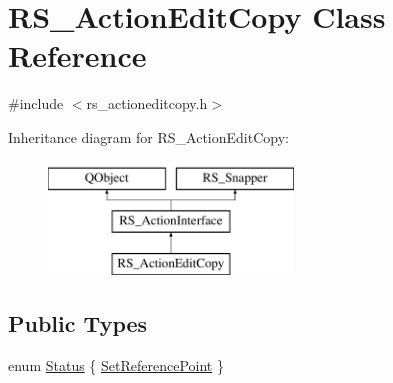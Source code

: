 \hypertarget{classRS__ActionEditCopy}{\section{R\-S\-\_\-\-Action\-Edit\-Copy Class Reference}
\label{classRS__ActionEditCopy}
}


{\ttfamily \#include $<$rs\-\_\-actioneditcopy.\-h$>$}

Inheritance diagram for R\-S\-\_\-\-Action\-Edit\-Copy\-:\begin{figure}[H]
\begin{center}
\leavevmode
\includegraphics[height=3.000000cm]{classRS__ActionEditCopy}
\end{center}
\end{figure}
\subsection*{Public Types}
\begin{DoxyCompactItemize}
\item 
enum \hyperlink{classRS__ActionEditCopy_a620b5387f51d29b1b9b6d2481c6d1ff9}{Status} \{ \hyperlink{classRS__ActionEditCopy_a620b5387f51d29b1b9b6d2481c6d1ff9a350b075c66965d65ec9f877c22488ad8}{Set\-Reference\-Point}
 \}
\end{DoxyCompactItemize}
